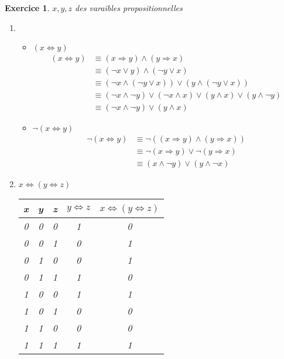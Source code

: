 \documentclass{article}
\theoremstyle{plain}
\newtheorem{exo}{Exercice}%
\begin{document}
\begin{exo} $x, y, z$ des varaibles propositionnelles
\begin{enumerate}
    \item \begin{itemize}
        \item $(x \Leftrightarrow y)$
        \begin{align*}
            (x \Leftrightarrow y)   & \equiv (x \Rightarrow y) \land (y \Rightarrow x) \\
                                    & \equiv (\neg x \vee y) \land (\neg y \vee x) \\
                                    & \equiv (\neg x \land (\neg y \vee x)) \vee 
                                        (y \land (\neg y \vee x)) \\
                                    & \equiv (\neg x \land \neg y) \vee (\neg x \land x)
                                        \vee (y \land x) \vee (y \land \neg y) \\
                                    & \equiv (\neg x \land \neg y) \vee (y \land x)
        \end{align*}
        \item $\neg(x \Leftrightarrow y)$
        \begin{align*}
            \neg(x \Leftrightarrow y)   & \equiv \neg((x \Rightarrow y) \land 
                                            (y \Rightarrow x)) \\
                                        & \equiv \neg(x \Rightarrow y) \vee 
                                            \neg(y \Rightarrow x) \\
                                        & \equiv (x \land \neg y) \vee
                                            (y \land \neg x)
        \end{align*}
    \end{itemize}

    \item $x \Leftrightarrow (y \Leftrightarrow z)$ \\
        \begin{tabular}{c | c | c| c | c}
            x & y & z & $y \Leftrightarrow z$ & 
            $x \Leftrightarrow (y \Leftrightarrow z)$ \\
            \hline
            0 & 0 & 0 & 1 & 0 \\
            0 & 0 & 1 & 0 & 1 \\
            0 & 1 & 0 & 0 & 1 \\
            0 & 1 & 1 & 1 & 0 \\
            1 & 0 & 0 & 1 & 1 \\
            1 & 0 & 1 & 0 & 0 \\
            1 & 1 & 0 & 0 & 0 \\
            1 & 1 & 1 & 1 & 1 \\
        \end{tabular}


\end{enumerate}
\end{exo}
\end{document}
